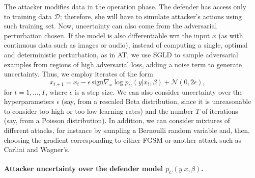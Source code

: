  The attacker modifies data in the operation phase.
 The defender has access only to training data $\mathcal{D}$; therefore, 
 she will have to simulate attacker's actions using such training set. Now, uncertainty can also come from the adversarial perturbation chosen. If the model is also differentiable wrt the input $x$ (as 
 with continuous data such as images or audio), instead of computing a single, optimal and deterministic perturbation, as in AT, we use SGLD to sample adversarial examples from regions of high adversarial loss, adding a noise term to generate uncertainty. Thus, we employ iterates of the form
\begin{equation}\label{eq:unc_attack}
x_{t+1} = x_t -\epsilon\, \mbox{sign} \nabla_x \log p_C(y|x_t,\beta) + \mathcal{N}(0, 2\epsilon),
\end{equation}
for $t=1,\ldots,T$, where $\epsilon$ is a step size. We can also consider uncertainty over the hyperparameters $\epsilon$ (say, from a rescaled Beta
distribution, since it is unreasonable to consider too high or too low learning rates) and the number $T$ of iterations (say, from a Poisson distribution). In addition, we can consider mixtures of different attacks, for instance by sampling a Bernoulli random variable and, then, choosing the gradient corresponding to either FGSM or another 
attack such as Carlini and Wagner's. 




\paragraph{Attacker uncertainty over the defender model $p_C(y|x,\beta)$.}

